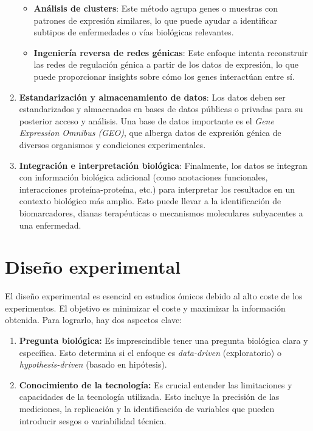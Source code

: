 \begin{enumerate}
\begin{itemize}
\item \textbf{Análisis de clusters}: Este método agrupa genes o muestras con patrones de expresión similares, lo que puede ayudar a identificar subtipos de enfermedades o vías biológicas relevantes.
\item \textbf{Ingeniería reversa de redes génicas}: Este enfoque intenta reconstruir las redes de regulación génica a partir de los datos de expresión, lo que puede proporcionar insights sobre cómo los genes interactúan entre sí.
\end{itemize}
\item \textbf{Estandarización y almacenamiento de datos}: Los datos deben ser estandarizados y almacenados en bases de datos públicas o privadas para su posterior acceso y análisis. Una base de datos importante es el \textit{Gene Expression Omnibus (GEO)}, que alberga datos de expresión génica de diversos organismos y condiciones experimentales.
\item \textbf{Integración e interpretación biológica}: Finalmente, los datos se integran con información biológica adicional (como anotaciones funcionales, interacciones proteína-proteína, etc.) para interpretar los resultados en un contexto biológico más amplio. Esto puede llevar a la identificación de biomarcadores, dianas terapéuticas o mecanismos moleculares subyacentes a una enfermedad.
\end{enumerate}

\section{Diseño experimental}
El diseño experimental es esencial en estudios ómicos debido al alto coste de los experimentos. El objetivo es minimizar el coste y maximizar la información obtenida. Para lograrlo, hay dos aspectos clave:
\begin{enumerate}
\item \textbf{Pregunta biológica:} Es imprescindible tener una pregunta biológica clara y específica. Esto determina si el enfoque es \textit{data-driven} (exploratorio) o \textit{hypothesis-driven} (basado en hipótesis).
\item \textbf{Conocimiento de la tecnología:} Es crucial entender las limitaciones y capacidades de la tecnología utilizada. Esto incluye la precisión de las mediciones, la replicación y la identificación de variables que pueden introducir sesgos o variabilidad técnica. 
\end{enumerate}

